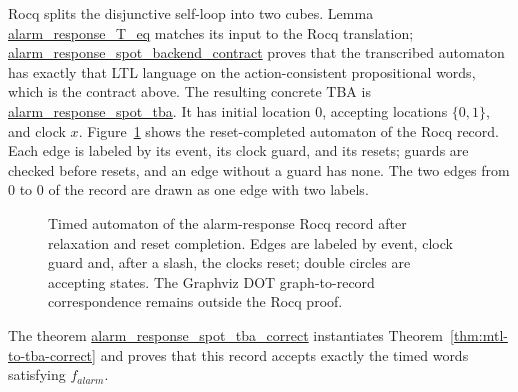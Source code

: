 \documentclass{ieeeaccess}
\newcommand{\Rocqid}[1]{\url{#1}}
\begin{document}
Rocq splits the disjunctive self-loop into two cubes. Lemma
\Rocqid{alarm_response_T_eq} matches its input to the Rocq translation;
\Rocqid{alarm_response_spot_backend_contract} proves that the transcribed
automaton has exactly that LTL language on the action-consistent propositional
words, which is the contract above. 
The resulting concrete TBA is \Rocqid{alarm_response_spot_tba}. It has initial
location $0$, accepting locations $\{0,1\}$, and clock $x$.
Figure~\ref{fig:alarm-tba} shows the reset-completed automaton of the Rocq
record. Each edge is labeled by its event, its clock guard, and its resets;
guards are checked before resets, and an edge without a guard has none. The
two edges from $0$ to $0$ of the record are drawn as one edge with two labels.
\begin{figure}[t]
\centering
{}
\caption{Timed automaton of the alarm-response Rocq record after relaxation
and reset completion. Edges are labeled by event, clock guard and, after a
slash, the clocks reset; double circles are accepting states. The Graphviz DOT
graph-to-record correspondence remains outside the Rocq proof.}
\label{fig:alarm-tba}
\end{figure}
The theorem \Rocqid{alarm_response_spot_tba_correct} instantiates
Theorem~\ref{thm:mtl-to-tba-correct} and proves that this record accepts
exactly the timed words satisfying $f_{\mathit{alarm}}$.
\end{document}
